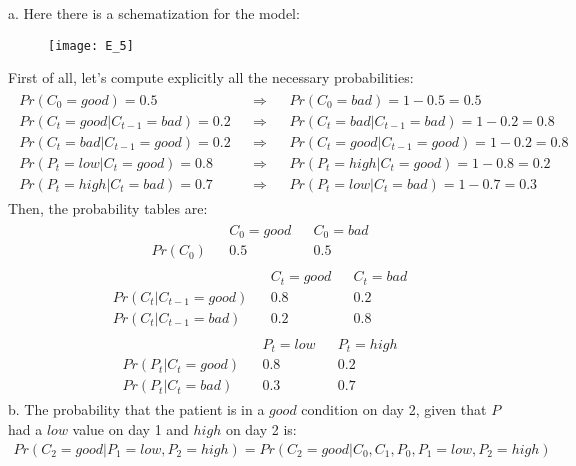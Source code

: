 \Answer[number={5}]
a. Here there is a schematization for the model:
\begin{figure}[H]
    \texttt{[image: E\_5]}
    \centering
\end{figure}
First of all, let's compute explicitly all the necessary probabilities:
\begin{align*}
    \begin{matrix}
        Pr(C_0=good)=0.5 && \Rightarrow && Pr(C_0=bad)=1-0.5=0.5\\
        Pr(C_{t}=good|C_{t-1}=bad)=0.2 && \Rightarrow && Pr(C_{t}=bad|C_{t-1}=bad)=1-0.2=0.8\\
        Pr(C_{t}=bad|C_{t-1}=good)=0.2 && \Rightarrow && Pr(C_{t}=good|C_{t-1}=good)=1-0.2=0.8\\
        Pr(P_{t}=low|C_{t}=good)=0.8 && \Rightarrow && Pr(P_{t}=high|C_{t}=good)=1-0.8=0.2\\
        Pr(P_{t}=high|C_{t}=bad)=0.7 && \Rightarrow && Pr(P_{t}=low|C_{t}=bad)=1-0.7=0.3
    \end{matrix}
\end{align*}
Then, the probability tables are:
\begin{align*}
    \begin{matrix}
        {} && C_0=good && C_0=bad\\
        Pr(C_0) && 0.5 && 0.5
    \end{matrix}
\end{align*}
\begin{align*}
    \begin{matrix}
        {} && C_t=good && C_t=bad\\
        Pr(C_t|C_{t-1}=good) && 0.8 && 0.2\\
        Pr(C_t|C_{t-1}=bad) && 0.2 && 0.8
    \end{matrix}
\end{align*}
\begin{align*}
    \begin{matrix}
        {} && P_t=low && P_t=high\\
        Pr(P_t|C_{t}=good) && 0.8 && 0.2\\
        Pr(P_t|C_{t}=bad) && 0.3 && 0.7
    \end{matrix}
\end{align*}
b. The probability that the patient is in a \(good\) condition on day 2,
given that \(P\) had a \(low\) value on day 1 and \(high\) on day 2 is:
\begin{align*}
    Pr(C_2=good|P_1=low,P_2=high)
    =Pr(C_2=good|C_0,C_1,P_0,P_1=low,P_2=high)
\end{align*}
